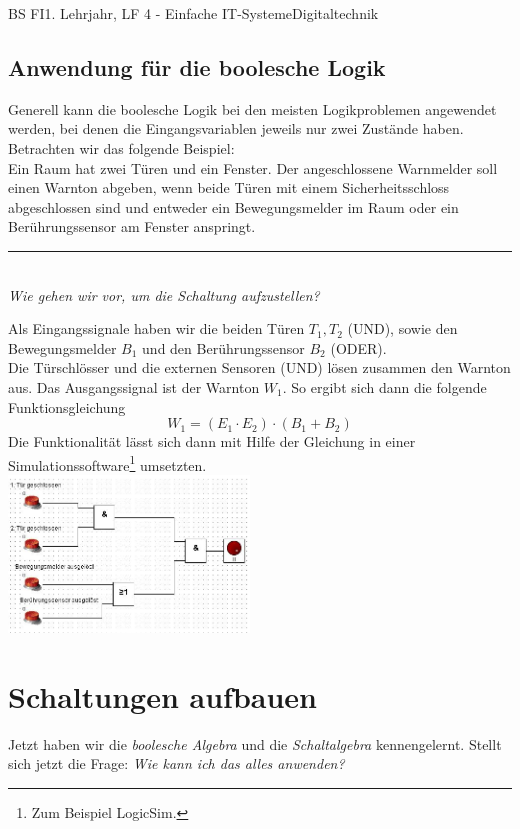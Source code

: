 \documentclass[11pt,twocolumn,oneside,openany,headings=optiontotoc,11pt,numbers=noenddot]{article}
\begin{document}
\begin{worksheet}{BS FI}{1. Lehrjahr, LF 4 - Einfache IT-Systeme}{Digitaltechnik}
		\subsection*{Anwendung für die boolesche Logik}
		Generell kann die boolesche Logik bei den meisten Logikproblemen angewendet werden, bei denen die Eingangsvariablen jeweils nur zwei Zustände haben.\\
		Betrachten wir das folgende Beispiel:\\
		Ein Raum hat zwei Türen und ein Fenster. Der angeschlossene Warnmelder soll einen Warnton abgeben, wenn beide Türen mit einem Sicherheitsschloss abgeschlossen sind und entweder ein Bewegungsmelder im Raum oder ein Berührungssensor am Fenster anspringt.\\
		\rule{0.48\textwidth}{0.1pt}\\
		\textit{Wie gehen wir vor, um die Schaltung aufzustellen?}\\
		\par\noindent
		Als Eingangssignale haben wir die beiden Türen \(T_1, T_2\) (UND), sowie den Bewegungsmelder \(B_1\) und den Berührungssensor \(B_2\) (ODER).\\
		Die Türschlösser und die externen Sensoren (UND) lösen zusammen den Warnton aus. Das Ausgangssignal ist der Warnton \(W_1\). So ergibt sich dann die folgende Funktionsgleichung \[W_1 = (E_1\cdot{}E_2)\cdot{}(B_1 + B_2)\]
		Die Funktionalität lässt sich dann mit Hilfe der Gleichung in einer Simulationssoftware\footnote{Zum Beispiel LogicSim.} umsetzten.\\
		\includegraphics[width=0.48\textwidth]{../99_Bilder/SkrAlarmanlage.jpg}\\
		\section{Schaltungen aufbauen}
		Jetzt haben wir die \textit{boolesche Algebra} und die \textit{Schaltalgebra} kennengelernt. Stellt sich jetzt die Frage: \textit{Wie kann ich das alles anwenden?}\\
		\par\noindent

\end{worksheet}
\end{document}
